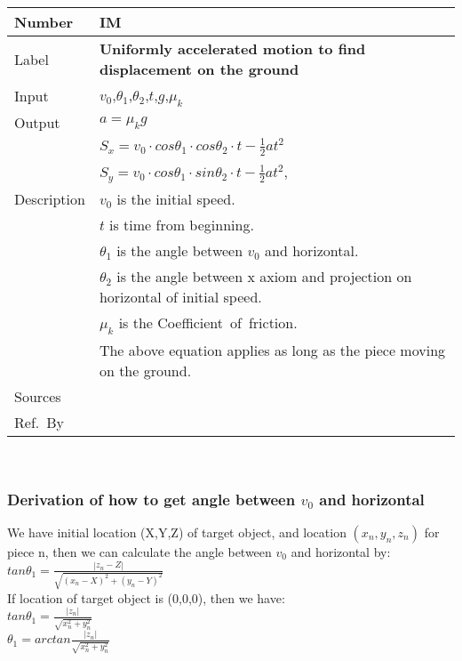 \documentclass[12pt]{article}
\newcommand{\colAwidth}{0.13\textwidth}
\newcommand{\colBwidth}{0.82\textwidth}
\newcounter{instnum} %
\begin{document}
\noindent
\begin{minipage}{\textwidth}
	\renewcommand*{\arraystretch}{1.5}
	\begin{tabular}{| p{\colAwidth} | p{\colBwidth}|}
		\hline
		\rowcolor[gray]{0.9}
		Number& IM{instnum}\theinstnum \label{IM_DOG}\\
		\hline
		Label& \bf Uniformly accelerated motion to find displacement on the ground\\
		\hline
		Input&$v_{0}$,$\theta_{1}$,$\theta_{2}$,$t$,$g$,$\mu_{k}$\\
		\hline
		Output&$a=\mu_{k}g$\\
		&$S_{x}=v_{0}\cdot cos\theta _{1}\cdot cos\theta _{2}\cdot t-\frac{1}{2}at^{2}$\\
		&$S_{y}=v_{0}\cdot cos\theta _{1}\cdot sin\theta _{2}\cdot t-\frac{1}{2}at^{2}$,\\
		\hline
		Description&$v_{0}$ is the initial speed.\\
		&$t$ is time from beginning.\\
		&$\theta _{1}$ is the angle between $v_{0}$ and horizontal.\\
		&$\theta _{2}$ is the angle between x axiom and projection on horizontal of initial speed.\\
		&$\mu_{k}$ is the Coefficient of friction.\\
		& The above equation applies as long as the piece moving on the ground.
		\\
		\hline
		Sources&~\ \ \\
		\hline
		Ref.\ By & \\
		\hline
	\end{tabular}
\end{minipage}\\


\subsubsection*{Derivation of how to get angle between $v_{0}$ and horizontal}

We have initial location (X,Y,Z) of target object, and location $(x_{n},y_{n},z_{n})$ for piece n, then we can calculate the angle between $v_{0}$ and horizontal by:
~\newline
\\
$tan\theta_{1}=\frac{|z_{n}-Z|}{\sqrt{(x_{n}-X)^{2}+(y_{n}-Y)^{2}}}$
~\newline
\\
If location of target object is (0,0,0), then we have:
~\newline
\\
$tan\theta_{1}=\frac{|z_{n}|}{\sqrt{x_{n}^{2}+y_{n}^{2}}}$
~\newline
\\
$\theta_{1}=arctan \frac{|z_{n}|}{\sqrt{x_{n}^2+y_{n}^2}}$
~\newline
\\
\end{document}
